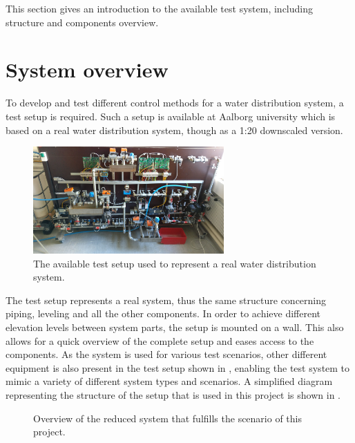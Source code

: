 This section gives an introduction to the available test system, including structure and components overview.  

\section{System overview}
\label{system_overview}
To develop and test different control methods for a water distribution system, a test setup is required.
Such a setup is available at Aalborg university which is based on a real water distribution system, though as a 1:20 downscaled version.

\begin{figure}[H]
\centering
\includegraphics[width=0.65\textwidth]{report/pictures/test_system_wide}
\caption{The available test setup used to represent a real water distribution system.}
\label{fig:test_setup}
\end{figure}


The test setup represents a real system, thus the same structure concerning piping, leveling and all the other components. In order to achieve different elevation levels between system parts, the setup is mounted on a wall. This also allows for a quick overview of the complete setup and eases access to the components. As the system is used for various test scenarios, other different equipment is also present in the test setup shown in , enabling the test system to mimic a variety of different system types and scenarios. A simplified diagram representing the structure of the setup that is used in this project is shown in . 

\begin{figure}[H]
\centering
 
\caption{Overview of the reduced system that fulfills the scenario of this project.}
\label{fig:sys_model_overview}
\end{figure}

